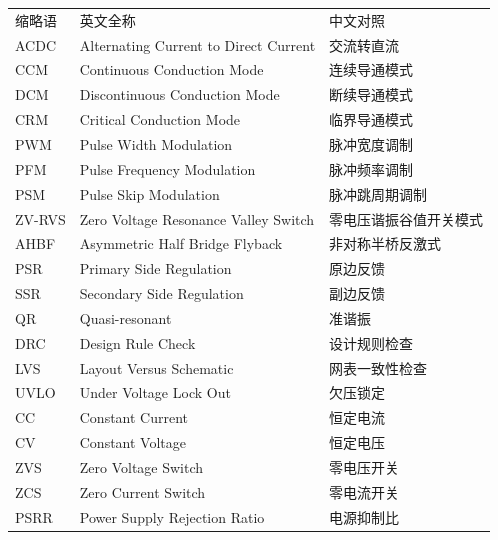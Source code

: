 \begin{center}
{
\renewcommand{\arraystretch}{1.28}
\begin{tabular}{p{2.5cm}p{6cm}l}
    缩略语 & 英文全称 &  中文对照 \\
    ACDC &  Alternating Current to Direct Current & 交流转直流\\
    CCM & Continuous Conduction Mode & 连续导通模式 \\
    DCM & Discontinuous Conduction Mode & 断续导通模式\\
    CRM & Critical Conduction Mode & 临界导通模式 \\
    PWM & Pulse Width Modulation & 脉冲宽度调制 \\
    PFM &  Pulse Frequency Modulation & 脉冲频率调制\\
    PSM & Pulse Skip Modulation & 脉冲跳周期调制 \\
    ZV-RVS & Zero Voltage Resonance Valley Switch & 零电压谐振谷值开关模式\\
    AHBF& Asymmetric Half Bridge Flyback& 非对称半桥反激式\\
    PSR&  Primary Side Regulation & 原边反馈\\
    SSR &  Secondary Side Regulation & 副边反馈\\
    QR & Quasi-resonant & 准谐振\\
    DRC & Design Rule Check & 设计规则检查\\
    LVS &  Layout Versus Schematic & 网表一致性检查\\
    UVLO & Under Voltage Lock Out & 欠压锁定\\
    CC & Constant Current & 恒定电流\\
    CV & Constant Voltage & 恒定电压\\
    ZVS & Zero Voltage Switch & 零电压开关\\
    ZCS & Zero Current Switch & 零电流开关\\
    PSRR & Power Supply Rejection Ratio & 电源抑制比 \\
%
\end{tabular}
}
\end{center}
